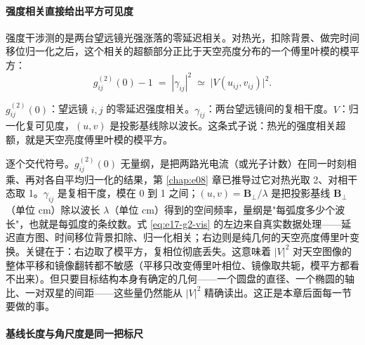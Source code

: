 \paragraph{强度相关直接给出平方可见度}
\label{sec:e17-g2-vis}

强度干涉测的是两台望远镜光强涨落的零延迟相关。对热光，扣除背景、做完时间移位归一化之后，这个相关的超额部分正比于天空亮度分布的一个傅里叶模的模平方：
\begin{equation}
  g^{(2)}_{ij}(0)-1 \;=\; |\gamma_{ij}|^2 \;\simeq\; \bigl|V(u_{ij},v_{ij})\bigr|^2 .
  \label{eq:e17-g2-vis}
\end{equation}
\begin{formulaexplain}
\(g^{(2)}_{ij}(0)\)：望远镜 \(i,j\) 的零延迟强度相关。\(\gamma_{ij}\)：两台望远镜间的复相干度。\(V\)：归一化复可见度，\((u,v)\) 是投影基线除以波长。这条式子说：热光的强度相关超额，就是天空亮度傅里叶模的模平方。
\end{formulaexplain}
逐个交代符号。\(g^{(2)}_{ij}(0)\) 无量纲，是把两路光电流（或光子计数）在同一时刻相乘、再对各自平均归一化的结果，第 \ref{chap:e08} 章已推导过它对热光取 2、对相干态取 1。\(\gamma_{ij}\) 是复相干度，模在 0 到 1 之间；\((u,v)=\bm{B}_\perp/\lambda\) 是把投影基线 \(\bm{B}_\perp\)（单位 cm）除以波长 \(\lambda\)（单位 cm）得到的空间频率，量纲是"每弧度多少个波长"，也就是每弧度的条纹数。式 \eqref{eq:e17-g2-vis} 的左边来自真实数据处理——延迟直方图、时间移位背景扣除、归一化相关；右边则是纯几何的天空亮度傅里叶变换。关键在于：右边取了模平方，复相位彻底丢失。这意味着 \(|V|^2\) 对天空图像的整体平移和镜像翻转都不敏感（平移只改变傅里叶相位、镜像取共轭，模平方都看不出来）。但只要目标结构本身有确定的几何——一个圆盘的直径、一个椭圆的轴比、一对双星的间距——这些量仍然能从 \(|V|^2\) 精确读出。这正是本章后面每一节要做的事。

\paragraph{基线长度与角尺度是同一把标尺}
\label{sec:e17-baseline}

